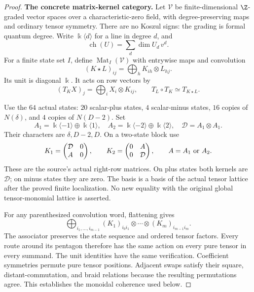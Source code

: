 \begin{proof}
\par\smallskip\noindent\textbf{The concrete matrix-kernel category.}\quad
Let $\mathcal V$ be finite-dimensional $\Z$-graded vector
spaces over a characteristic-zero field, with
degree-preserving maps and ordinary tensor symmetry.
There are no Koszul signs: the grading is formal
quantum degree.
Write $\Bbbk\langle d\rangle$ for a line in degree $d$,
and
\[
 \operatorname{ch}(U)=\sum_d\dim U_d\,v^d.
\]
For a finite state set $I$, define
$\operatorname{Mat}_I(\mathcal V)$ with entrywise maps and
convolution
\begin{equation}\label{eq:gradedmatrixconvolution}
 (K\star L)_{ij}=\bigoplus_h K_{ih}\otimes L_{hj}.
\end{equation}
Its unit is diagonal $\Bbbk$.
It acts on row vectors by
\[
 (T_K X)_j=\bigoplus_i X_i\otimes K_{ij},
 \qquad T_L\circ T_K\simeq T_{K\star L}.
\]

Use the $64$ actual  states: $20$ scalar-plus
states, $4$ scalar-minus states, $16$ copies of $N(\delta)$,
and $4$ copies of $N(D-2)$.
Set
\[
 A_1=\Bbbk\langle-1\rangle\oplus\Bbbk\langle1\rangle,\quad
 A_2=\Bbbk\langle-2\rangle\oplus\Bbbk\langle2\rangle,\quad
 \mathcal D=A_1\otimes A_1.
\]
Their characters are $\delta,D-2,D$.
On a two-state block use
\begin{equation}\label{eq:actualgradedkernels}
 K_1=\begin{pmatrix}\mathcal D&0\\A&0\end{pmatrix},
 \qquad
 K_2=\begin{pmatrix}0&A\\0&\mathcal D\end{pmatrix},
 \qquad A=A_1\ \hbox{or}\ A_2.
\end{equation}
These are the source's actual right-row matrices.
On plus states both kernels are $\mathcal D$; on minus
states they are zero.
The basis is a basis of the actual tensor lattice after
the proved finite localization.
No new equality with the original global tensor-monomial
lattice is asserted.

For any parenthesized convolution word, flattening gives
\[
 \bigoplus_{i_1,\ldots,i_{m-1}}
 (K_1)_{i_0i_1}\otimes\cdots\otimes(K_m)_{i_{m-1}i_m}.
\]
The associator preserves the state sequence and ordered
tensor factors.
Every route around its pentagon therefore has the same
action on every pure tensor in every summand.
The unit identities have the same verification.
Coefficient symmetries permute pure tensor positions.
Adjacent swaps satisfy their square, distant-commutation,
and braid relations because the resulting permutations agree.
This establishes the monoidal coherence used below.


\end{proof}
